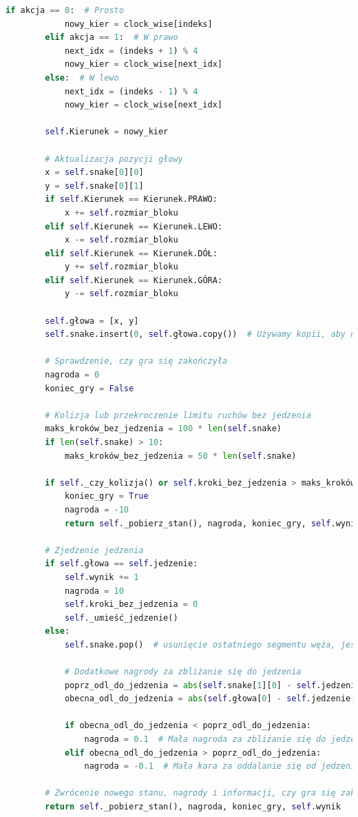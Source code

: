 \documentclass[a4paper,12pt]{article}
\begin{document}
\begin{lstlisting}[language=Python]
        if akcja == 0:  # Prosto
            nowy_kier = clock_wise[indeks]
        elif akcja == 1:  # W prawo
            next_idx = (indeks + 1) % 4
            nowy_kier = clock_wise[next_idx]
        else:  # W lewo
            next_idx = (indeks - 1) % 4
            nowy_kier = clock_wise[next_idx]
            
        self.Kierunek = nowy_kier
        
        # Aktualizacja pozycji głowy
        x = self.snake[0][0]
        y = self.snake[0][1]
        if self.Kierunek == Kierunek.PRAWO:
            x += self.rozmiar_bloku
        elif self.Kierunek == Kierunek.LEWO:
            x -= self.rozmiar_bloku
        elif self.Kierunek == Kierunek.DÓŁ:
            y += self.rozmiar_bloku
        elif self.Kierunek == Kierunek.GÓRA:
            y -= self.rozmiar_bloku
            
        self.głowa = [x, y]
        self.snake.insert(0, self.głowa.copy())  # Używamy kopii, aby uniknąć referencji
        
        # Sprawdzenie, czy gra się zakończyła
        nagroda = 0
        koniec_gry = False
        
        # Kolizja lub przekroczenie limitu ruchów bez jedzenia
        maks_kroków_bez_jedzenia = 100 * len(self.snake)
        if len(self.snake) > 10:
            maks_kroków_bez_jedzenia = 50 * len(self.snake)
            
        if self._czy_kolizja() or self.kroki_bez_jedzenia > maks_kroków_bez_jedzenia:
            koniec_gry = True
            nagroda = -10
            return self._pobierz_stan(), nagroda, koniec_gry, self.wynik
            
        # Zjedzenie jedzenia
        if self.głowa == self.jedzenie:
            self.wynik += 1
            nagroda = 10
            self.kroki_bez_jedzenia = 0
            self._umieść_jedzenie()
        else:
            self.snake.pop()  # usunięcie ostatniego segmentu węża, jeśli nie zjadł jedzenia
            
            # Dodatkowe nagrody za zbliżanie się do jedzenia
            poprz_odl_do_jedzenia = abs(self.snake[1][0] - self.jedzenie[0]) + abs(self.snake[1][1] - self.jedzenie[1])
            obecna_odl_do_jedzenia = abs(self.głowa[0] - self.jedzenie[0]) + abs(self.głowa[1] - self.jedzenie[1])
            
            if obecna_odl_do_jedzenia < poprz_odl_do_jedzenia:
                nagroda = 0.1  # Mała nagroda za zbliżanie się do jedzenia
            elif obecna_odl_do_jedzenia > poprz_odl_do_jedzenia:
                nagroda = -0.1  # Mała kara za oddalanie się od jedzenia
        
        # Zwrócenie nowego stanu, nagrody i informacji, czy gra się zakończyła
        return self._pobierz_stan(), nagroda, koniec_gry, self.wynik

\end{lstlisting}
\end{document}
